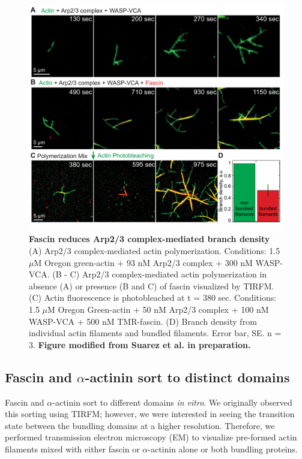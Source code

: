 \begin{figure}
\centering
\includegraphics[width=\textwidth]{img/ch03/Thesis_branching.pdf}
\caption[]{\textbf{Fascin reduces Arp2/3 complex-mediated branch density} (A) Arp2/3 complex-mediated actin polymerization. Conditions: 1.5 $\mu$M Oregon green-actin + 93 nM Arp2/3 complex + 300 nM WASP-VCA.
(B - C) Arp2/3 complex-mediated actin polymerization in absence (A) or presence (B and C) of fascin visualized by TIRFM. (C) Actin fluorescence is photobleached at t = 380 sec. Conditions: 1.5 $\mu$M Oregon Green-actin + 50 nM Arp2/3 complex + 100 nM WASP-VCA + 500 nM TMR-fascin. (D) Branch density from individual actin filaments and bundled filaments. Error bar, SE. n = 3. \textbf{Figure modified from Suarez et al. in preparation.}}
\label{fig:fascin_branching}
\end{figure}

\subsection{Fascin and \texorpdfstring{$\alpha$}{alpha}-actinin sort to distinct domains}
Fascin and $\alpha$-actinin sort to different domains \textit{in vitro}. We originally observed this sorting using TIRFM; however, we were interested in seeing the transition state between the bundling domains at a higher resolution. Therefore, we performed transmission electron microscopy (EM) to visualize pre-formed actin filaments mixed with either fascin or $\alpha$-actinin alone or both bundling proteins. 

